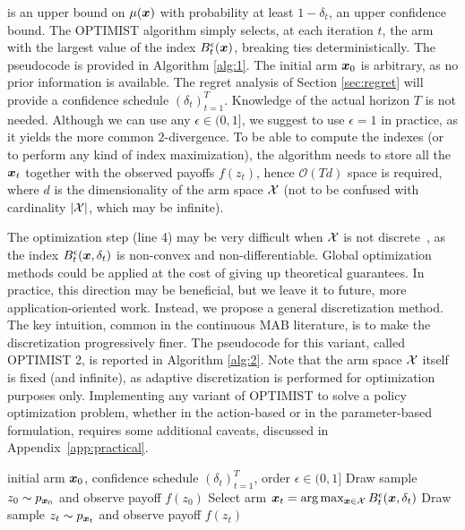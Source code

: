 \documentclass{article}
\makeatletter
\DeclareRobustCommand{\algoname}{OPTIMIST\@\xspace}
\makeatother
\begin{document}
is an upper bound on $\mu(\boldsymbol{x})$ with probability at least $1-\delta_t$, \ie an upper confidence bound. The \algoname algorithm simply selects, at each iteration $t$, the arm with the largest value of the index $B_t^{\epsilon}(\boldsymbol{x})$, breaking ties deterministically. The pseudocode is provided in Algorithm \ref{alg:1}. The initial arm $\boldsymbol{x}_0$ is arbitrary, as no prior information is available. The regret analysis of Section \ref{sec:regret} will provide a confidence schedule $(\delta_t)_{t=1}^T$. Knowledge of the actual horizon $T$ is not needed. Although we can use any $\epsilon\in (0,1]$, we suggest to use $\epsilon=1$ in practice, as it yields the more common $2$-\Renyi divergence. To be able to compute the indexes (or to perform any kind of index maximization), the algorithm needs to store all the $\boldsymbol{x}_t$ together with the observed payoffs $f(z_t)$, hence $\mathcal{O}(Td)$ space is required, where $d$ is the dimensionality of the arm space $\mathcal{X}$ (not to be confused with cardinality $|\mathcal{X}|$, which may be infinite). 

The optimization step (line 4) may be very difficult when $\mathcal{X}$ is not discrete~\citep[\cf][]{srinivas2010gaussian}, as the index $B_t^{\epsilon}(\boldsymbol{x},\delta_t)$ is non-convex and non-differentiable. Global optimization methods could be applied at the cost of giving up theoretical guarantees. In practice, this direction may be beneficial, but we leave it to future, more application-oriented work. Instead, we propose a general discretization method. The key intuition, common in the continuous MAB literature, is to make the discretization progressively finer. The pseudocode for this variant, called \algoname2, is reported in Algorithm \ref{alg:2}. Note that the arm space $\mathcal{X}$ itself is fixed (and infinite), as adaptive discretization is performed for optimization purposes only. 
Implementing any variant of \algoname to solve a policy optimization problem, whether in the action-based or in the parameter-based formulation, requires some additional caveats, discussed in Appendix~\ref{app:practical}.

\begin{algorithm}[t]
	\caption{\algoname}
	\label{alg:1}
	\begin{algorithmic}[1]
	 initial arm $\boldsymbol{x}_0$, confidence schedule $(\delta_t)_{t=1}^T$, order ${\epsilon\in(0,1]}$
	\STATE Draw sample $z_0\sim p_{\boldsymbol{x}_0}$ and observe payoff $f(z_0)$
		\STATE Select arm $\boldsymbol{x}_t = \arg\max_{\boldsymbol{x}\in\mathcal{X}}B_t^{\epsilon}(\boldsymbol{x},\delta_t)$
		\STATE Draw sample $z_t\sim p_{\boldsymbol{x}_t}$ and observe payoff $f(z_t)$
	\ENDFOR
	\end{algorithmic}
\end{algorithm}
\end{document}
